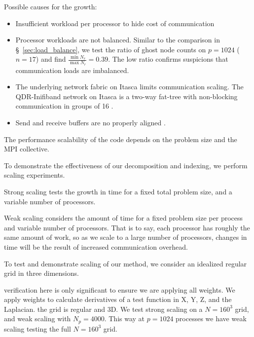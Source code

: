 \documentclass{report}
\begin{document}
Possible causes for the growth: 
\begin{itemize} 
\item Insufficient workload per processor to hide cost of communication
\item Processor workloads are not balanced. Similar to the comparison in \S~\ref{sec:load_balance}, we test the ratio of ghost node counts on $p=1024$ ($n=17$) and find  $\frac{\min N_r}{\max N_r} = 0.39$. The low ratio confirms suspicions that communication loads are imbalanced. 
\item The underlying network fabric on Itasca limits communication scaling. The QDR-Inifiband network on Itasca is a two-way fat-tree with non-blocking communication in groups of 16 . 
\item Send and receive buffers are no properly aligned . 
\end{itemize}




The performance scalability of the code depends on the problem size and the MPI collective. 

To demonstrate the effectiveness of our decomposition and indexing, we perform scaling experiments. 

Strong scaling tests the growth in time for a fixed total problem size, and a variable number of processors. 

Weak scaling considers the amount of time for a fixed problem size per process and variable number of processors. That is to say, each processor has roughly the same amount of work, so as we scale to a large number of processors, changes in time will be the result of increased communication overhead. 


To test and demonstrate scaling of our method, we consider an idealized regular grid in three dimensions. 

verification here is only significant to ensure we are applying all weights. 
We apply weights to calculate derivatives of a test function in X, Y, Z, and the Laplacian. 
the grid is regular and 3D.
We test strong scaling on a $N=160^3$ grid, and weak scaling with $N_p=4000$. This way at $p=1024$ processes we have weak scaling testing the full $N=160^3$ grid. 
\end{document}
